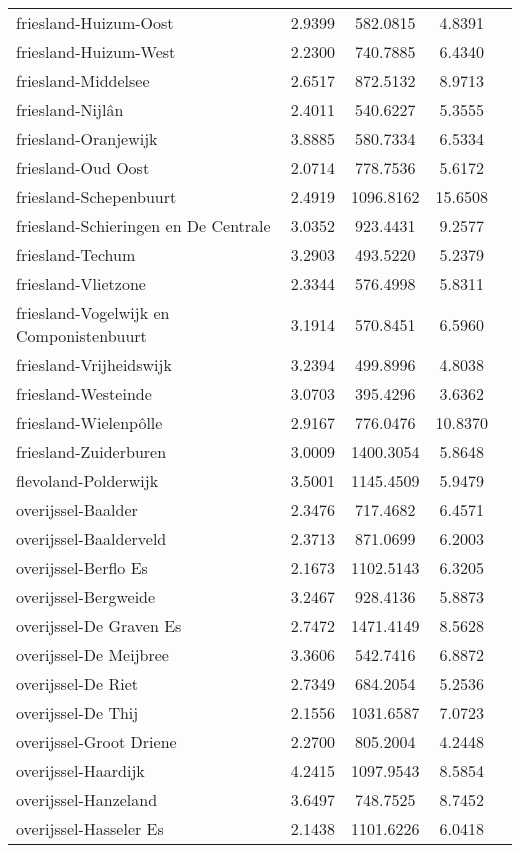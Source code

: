 \begin{longtable}{llccc}
friesland-Huizum-Oost & 2.9399 & 582.0815 & 4.8391 \\
friesland-Huizum-West & 2.2300 & 740.7885 & 6.4340 \\
friesland-Middelsee & 2.6517 & 872.5132 & 8.9713 \\
friesland-Nijlân & 2.4011 & 540.6227 & 5.3555 \\
friesland-Oranjewijk & 3.8885 & 580.7334 & 6.5334 \\
friesland-Oud Oost & 2.0714 & 778.7536 & 5.6172 \\
friesland-Schepenbuurt & 2.4919 & 1096.8162 & 15.6508 \\
friesland-Schieringen en De Centrale & 3.0352 & 923.4431 & 9.2577 \\
friesland-Techum & 3.2903 & 493.5220 & 5.2379 \\
friesland-Vlietzone & 2.3344 & 576.4998 & 5.8311 \\
friesland-Vogelwijk en Componistenbuurt & 3.1914 & 570.8451 & 6.5960 \\
friesland-Vrijheidswijk & 3.2394 & 499.8996 & 4.8038 \\
friesland-Westeinde & 3.0703 & 395.4296 & 3.6362 \\
friesland-Wielenpôlle & 2.9167 & 776.0476 & 10.8370 \\
friesland-Zuiderburen & 3.0009 & 1400.3054 & 5.8648 \\
flevoland-Polderwijk & 3.5001 & 1145.4509 & 5.9479 \\
overijssel-Baalder & 2.3476 & 717.4682 & 6.4571 \\
overijssel-Baalderveld & 2.3713 & 871.0699 & 6.2003 \\
overijssel-Berflo Es & 2.1673 & 1102.5143 & 6.3205 \\
overijssel-Bergweide & 3.2467 & 928.4136 & 5.8873 \\
overijssel-De Graven Es & 2.7472 & 1471.4149 & 8.5628 \\
overijssel-De Meijbree & 3.3606 & 542.7416 & 6.8872 \\
overijssel-De Riet & 2.7349 & 684.2054 & 5.2536 \\
overijssel-De Thij & 2.1556 & 1031.6587 & 7.0723 \\
overijssel-Groot Driene & 2.2700 & 805.2004 & 4.2448 \\
overijssel-Haardijk & 4.2415 & 1097.9543 & 8.5854 \\
overijssel-Hanzeland & 3.6497 & 748.7525 & 8.7452 \\
overijssel-Hasseler Es & 2.1438 & 1101.6226 & 6.0418 \\

\end{longtable}
